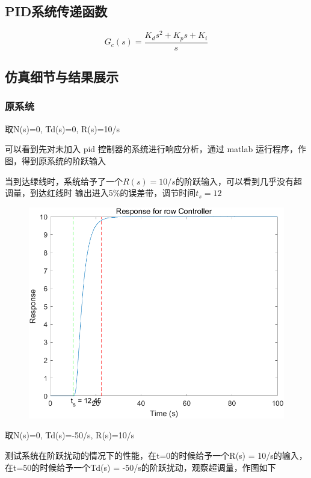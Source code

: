 \documentclass{thuemp}
\begin{document}
\subsection{PID系统传递函数}
$$
G_c\left(s\right)=\frac{K_ds^2+K_ps+K_i}{s}
$$

\subsection{仿真细节与结果展示}
\subsubsection{原系统}
取N(s)=0, Td(s)=0, R(s)=10/s

可以看到先对未加入 pid 控制器的系统进行响应分析，通过 matlab 运行程序，作图，得到原系统的阶跃输入

当到达绿线时，系统给予了一个$R(s)=10/s$的阶跃输入，可以看到几乎没有超调量，到达红线时
输出进入5\%的误差带，调节时间$t_s = 12$
\begin{figure}[H]
\centering
\includegraphics[width=1\linewidth]{./img/None_p1_R.png}
\end{figure}

取N(s)=0, Td(s)=-50/s, R(s)=10/s

测试系统在阶跃扰动的情况下的性能，在t=0的时候给予一个R(s) = 10/s的输入，
在t=50的时候给予一个Td(s) = -50/s的阶跃扰动，观察超调量，作图如下
\end{document}
